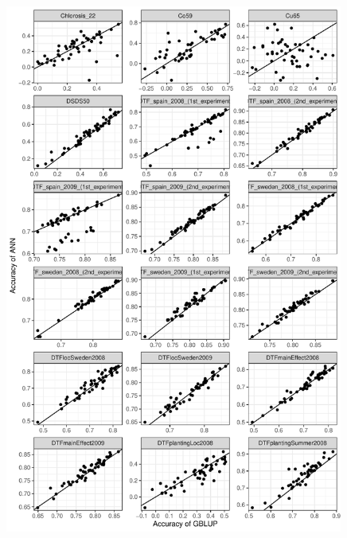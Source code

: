 \begin{figure}[H]
  \centering \includegraphics[height=0.99\textheight, width=0.99\textwidth]{Figures/gray_cor_plots_2}
  \decoRule
 \label{fig:bla}
\end{figure}

